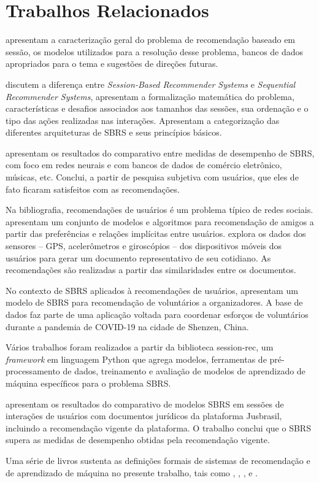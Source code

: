 \section{Trabalhos Relacionados}

\citet{rec_sys_handbook_2022} apresentam a caracterização geral do problema de recomendação
baseado em sessão, os modelos utilizados para a resolução desse problema, bancos de dados apropriados para o tema e
sugestões de direções futuras. \cite{rec_sys_handbook_2022, JLZ18,LATIFI_2021, quadrana2018sequence}

\citet{survey_wang_2021} discutem a diferença entre \textit{Session-Based Recommender Systems}
e \textit{Sequential Recommender Systems}, apresentam a formalização matemática
do problema, características e desafios associados aos tamanhos das sessões, sua
ordenação e o tipo das ações realizadas nas interações. Apresentam a
categorização das diferentes arquiteturas de SBRS e seus princípios básicos.

\citet{ludewig2021empirical}
apresentam os resultados do comparativo entre medidas de desempenho de
SBRS, com foco em redes neurais e com bancos de dados de comércio eletrônico,
músicas, etc. Conclui, a partir de pesquisa subjetiva com usuários, que eles de
fato ficaram satisfeitos com as recomendações.
\cite{ludewig2021empirical, ludewig_2018,ludewig_2019,ludewig2020advances}

Na bibliografia, recomendações de usuários é um problema típico de
redes sociais. \citet{cui2018dual} apresentam um conjunto de modelos e
algoritmos para recomendação de amigos a partir das preferências e relações
implícitas entre usuários. \citet{wang2014friendbook} explora os dados dos
sensores -- GPS, acelerômetros e giroscópios -- dos dispositivos móveis dos
usuários para gerar um documento representativo de seu cotidiano. As
recomendações são realizadas a partir das similaridades entre os documentos.

No contexto de SBRS aplicados à recomendações de usuários,
\citet{muvunza2023session} apresentam um modelo de SBRS para recomendação de
voluntários a organizadores. A base de dados faz parte de uma aplicação voltada
para coordenar esforços de voluntários durante a pandemia de COVID-19 na cidade de
Shenzen, China.

Vários trabalhos
\cite{LATIFI_2021,ludewig2021empirical,ludewig_2018,ludewig_2019,sessionrec,
jusbrasil2022} foram realizados a partir da biblioteca session-rec, um
\textit{framework} em linguagem Python que agrega modelos, ferramentas de
pré-processamento de dados, treinamento e avaliação de modelos de aprendizado de
máquina específicos para o problema SBRS.

 \citet{jusbrasil2022} apresentam os resultados do comparativo de modelos SBRS em
sessões de interações de usuários com documentos jurídicos da plataforma
Jusbrasil, incluindo a recomendação vigente da plataforma. O trabalho
conclui que o SBRS supera as medidas de desempenho obtidas pela recomendação
vigente.

Uma série de livros sustenta as definições formais de sistemas de
recomendação e de aprendizado de máquina no presente trabalho, tais como
\citet{pml1Book}, \citet{jannach2011recommender}, \citet{ricci2010introduction},
\citet{mitchell1997} e \citet{aggarwal2016recommender}.